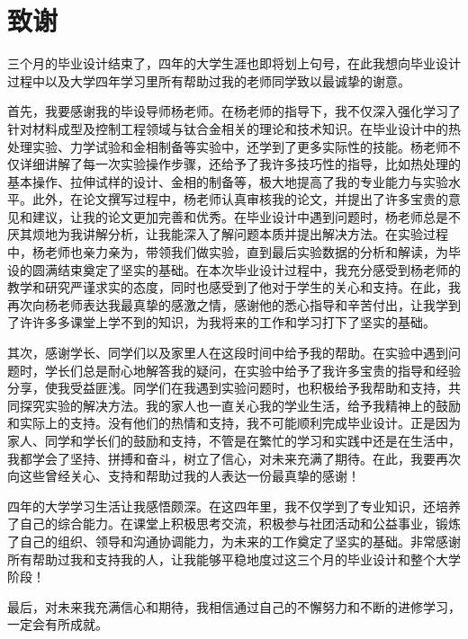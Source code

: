 \chapter{致谢}
三个月的毕业设计结束了，四年的大学生涯也即将划上句号，在此我想向毕业设计过程中以及大学四年学习里所有帮助过我的老师同学致以最诚挚的谢意。

首先，我要感谢我的毕设导师杨老师。在杨老师的指导下，我不仅深入强化学习了针对材料成型及控制工程领域与钛合金相关的理论和技术知识。在毕业设计中的热处理实验、力学试验和金相制备等实验中，还学到了更多实际性的技能。杨老师不仅详细讲解了每一次实验操作步骤，还给予了我许多技巧性的指导，比如热处理的基本操作、拉伸试样的设计、金相的制备等，极大地提高了我的专业能力与实验水平。此外，在论文撰写过程中，杨老师认真审核我的论文，并提出了许多宝贵的意见和建议，让我的论文更加完善和优秀。在毕业设计中遇到问题时，杨老师总是不厌其烦地为我讲解分析，让我能深入了解问题本质并提出解决方法。在实验过程中，杨老师也亲力亲为，带领我们做实验，直到最后实验数据的分析和解读，为毕设的圆满结束奠定了坚实的基础。在本次毕业设计过程中，我充分感受到杨老师的教学和研究严谨求实的态度，同时也感受到了他对于学生的关心和支持。在此，我再次向杨老师表达我最真挚的感激之情，感谢他的悉心指导和辛苦付出，让我学到了许许多多课堂上学不到的知识，为我将来的工作和学习打下了坚实的基础。

其次，感谢学长、同学们以及家里人在这段时间中给予我的帮助。在实验中遇到问题时，学长们总是耐心地解答我的疑问，在实验中给予了我许多宝贵的指导和经验分享，使我受益匪浅。同学们在我遇到实验问题时，也积极给予我帮助和支持，共同探究实验的解决方法。我的家人也一直关心我的学业生活，给予我精神上的鼓励和实际上的支持。没有他们的热情和支持，我不可能顺利完成毕业设计。正是因为家人、同学和学长们的鼓励和支持，不管是在繁忙的学习和实践中还是在生活中，我都学会了坚持、拼搏和奋斗，树立了信心，对未来充满了期待。在此，我要再次向这些曾经关心、支持和帮助过我的人表达一份最真挚的感谢！

四年的大学学习生活让我感悟颇深。在这四年里，我不仅学到了专业知识，还培养了自己的综合能力。在课堂上积极思考交流，积极参与社团活动和公益事业，锻炼了自己的组织、领导和沟通协调能力，为未来的工作奠定了坚实的基础。非常感谢所有帮助过我和支持我的人，让我能够平稳地度过这三个月的毕业设计和整个大学阶段！

最后，对未来我充满信心和期待，我相信通过自己的不懈努力和不断的进修学习，一定会有所成就。
